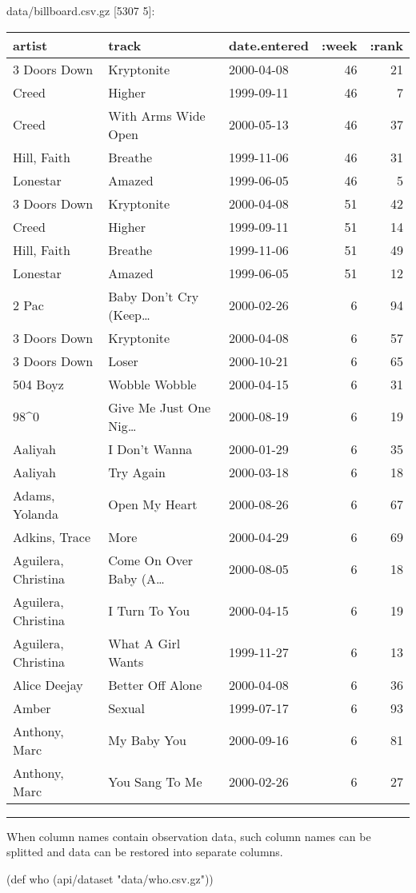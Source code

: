 \documentclass[]{article}
\newenvironment{Shaded}{\begin{snugshade}}{\end{snugshade}}
\newcommand{\StringTok}[1]{\textcolor[rgb]{0.31,0.60,0.02}{#1}}
\newcommand{\FunctionTok}[1]{\textcolor[rgb]{0.00,0.00,0.00}{#1}}
\newcommand{\BuiltInTok}[1]{#1}
\newcommand{\NormalTok}[1]{#1}
\begin{document}
data/billboard.csv.gz {[}5307 5{]}:

\begin{longtable}[]{@{}lllrr@{}}
\toprule
artist & track & date.entered & :week & :rank\tabularnewline
\midrule
\endhead
3 Doors Down & Kryptonite & 2000-04-08 & 46 & 21\tabularnewline
Creed & Higher & 1999-09-11 & 46 & 7\tabularnewline
Creed & With Arms Wide Open & 2000-05-13 & 46 & 37\tabularnewline
Hill, Faith & Breathe & 1999-11-06 & 46 & 31\tabularnewline
Lonestar & Amazed & 1999-06-05 & 46 & 5\tabularnewline
3 Doors Down & Kryptonite & 2000-04-08 & 51 & 42\tabularnewline
Creed & Higher & 1999-09-11 & 51 & 14\tabularnewline
Hill, Faith & Breathe & 1999-11-06 & 51 & 49\tabularnewline
Lonestar & Amazed & 1999-06-05 & 51 & 12\tabularnewline
2 Pac & Baby Don't Cry (Keep\ldots{} & 2000-02-26 & 6 &
94\tabularnewline
3 Doors Down & Kryptonite & 2000-04-08 & 6 & 57\tabularnewline
3 Doors Down & Loser & 2000-10-21 & 6 & 65\tabularnewline
504 Boyz & Wobble Wobble & 2000-04-15 & 6 & 31\tabularnewline
98\^{}0 & Give Me Just One Nig\ldots{} & 2000-08-19 & 6 &
19\tabularnewline
Aaliyah & I Don't Wanna & 2000-01-29 & 6 & 35\tabularnewline
Aaliyah & Try Again & 2000-03-18 & 6 & 18\tabularnewline
Adams, Yolanda & Open My Heart & 2000-08-26 & 6 & 67\tabularnewline
Adkins, Trace & More & 2000-04-29 & 6 & 69\tabularnewline
Aguilera, Christina & Come On Over Baby (A\ldots{} & 2000-08-05 & 6 &
18\tabularnewline
Aguilera, Christina & I Turn To You & 2000-04-15 & 6 & 19\tabularnewline
Aguilera, Christina & What A Girl Wants & 1999-11-27 & 6 &
13\tabularnewline
Alice Deejay & Better Off Alone & 2000-04-08 & 6 & 36\tabularnewline
Amber & Sexual & 1999-07-17 & 6 & 93\tabularnewline
Anthony, Marc & My Baby You & 2000-09-16 & 6 & 81\tabularnewline
Anthony, Marc & You Sang To Me & 2000-02-26 & 6 & 27\tabularnewline
\bottomrule
\end{longtable}

\begin{center}\rule{0.5\linewidth}{0.5pt}\end{center}

When column names contain observation data, such column names can be
splitted and data can be restored into separate columns.

\begin{Shaded}
\begin{Highlighting}[]
\NormalTok{(}\BuiltInTok{def}\FunctionTok{ who }\NormalTok{(api/dataset }\StringTok{"data/who.csv.gz"}\NormalTok{))}
\end{Highlighting}
\end{Shaded}
\end{document}
